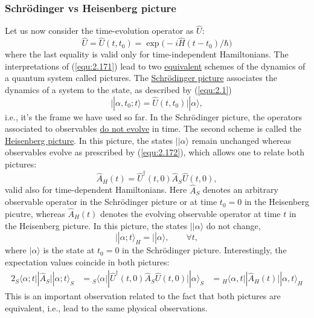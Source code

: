 \subsubsection{Schrödinger vs Heisenberg picture}
Let us now consider the time-evolution operator as
$\hat{U}$:
\begin{equation}
  \hat{U} = \hat{U}(t,t_0) =
  \exp\bigl(-i\hat{H}(t-t_0)/\hbar\bigr)
  \label{equ:2.174}
\end{equation}
where the last equality is valid only for time-independent
Hamiltonians.
The interpretations of (\ref{equ:2.171}) lead to two
\underline{equivalent} schemes of the dynamics of a quantum
system called pictures. The \underline{Schrödinger picture}
associates the dynamics of a system to the state, as
described by (\ref{equ:2.1})
$$
\vert| \alpha, t_0 ; t \rangle = \hat{U} (t,t_0) \vert|
\alpha \rangle,
$$
i.e., it's the frame we have used so far. In the Schrödinger
picture, the operators associated to observables
\underline{do not evolve} in time.
The second scheme is called the \underline{Heisenberg
picture}. In this picture, the states $\vert| \alpha
\rangle$ remain unchanged whereas observables evolve as
prescribed by (\ref{equ:2.172}), which allows one to relate
both pictures:
\begin{equation}
  \hat{A}_{H} (t) = \hat{U}^{\dagger}(t,0) \hat{A}_S
  \hat{U}(t,0),
  \label{equ:2.175}
\end{equation}
valid also for time-dependent Hamiltonians. Here $\hat{A}_S$
denotes an
arbitrary observable operator in the Schrödinger picture or
at time $t_0 = 0$ in the Heisenberg picutre, whereas
$\hat{A}_H(t)$ denotes the evolving observable operator at
time $t$ in the Heisenberg picture. In this picture, the
states $\vert| \alpha \rangle$ do not change,
\begin{equation}
  \vert| \alpha; t \rangle_H = \vert | \alpha \rangle,
  \qquad \forall t,
  \label{equ:2.176}
\end{equation}
where $\vert \alpha \rangle$ is the state at $t_0 = 0$ in
the Schrödinger picture.
Interestingly, the expectation values coincide in both
pictures:
\begin{alignat}{2}
  {}_S\langle \alpha; t \vert| \hat{A}_S \vert| \alpha; t
  \rangle_S &= {}_S \langle \alpha \vert |
  \hat{U}^{\dagger}(t,0) \hat{A}_S \hat{U}(t,0) \vert|
  \alpha \rangle_S \nonumber
  &= {}_H \langle \alpha, t \vert| \hat{A}_H (t) \vert|
  \alpha, t \rangle_H \label{equ:2.177}
\end{alignat}
 This is an important observation related to the fact that
 both pictures are equivalent, i.e., lead to the same
 physical observations.

